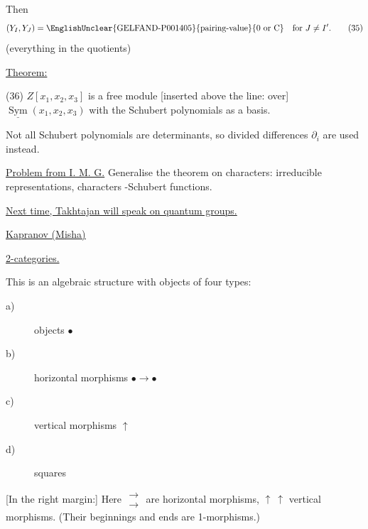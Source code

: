 Then
\begin{equation*}
(Y_I,Y_J)=\text{\EnglishUnclear{GELFAND-P001405}{pairing-value}{0 or C}}
\quad\text{for }J\ne I'.\tag{35}
\end{equation*}
(everything in the quotients)

\underline{Theorem:}

(36) $Z[x_1,x_2,x_3]$ is a free module [inserted above the line: over]
$\underline{\operatorname{Sym}}(x_1,x_2,x_3)$
with the Schubert polynomials as a basis.

Not all Schubert polynomials are determinants, so divided differences
$\partial_i$ are used instead.

\underline{Problem from I. M. G.} Generalise the theorem on characters: irreducible representations, characters
-Schubert functions.

\underline{Next time, Takhtajan will speak on quantum groups.}

\underline{\underline{Kapranov (Misha)}}

\underline{2-categories.}

This is an algebraic structure with objects of four types:
\begin{description}
\item[a)] objects $\bullet$
\item[b)] horizontal morphisms $\bullet\longrightarrow\bullet$
\item[c)] vertical morphisms $\uparrow$
\item[d)] squares
\end{description}

[In the right margin:]
Here $\begin{matrix}\longrightarrow\\\longrightarrow\end{matrix}$ are horizontal morphisms,
$\uparrow\ \uparrow$ vertical morphisms.
(Their beginnings and ends are 1-morphisms.)


